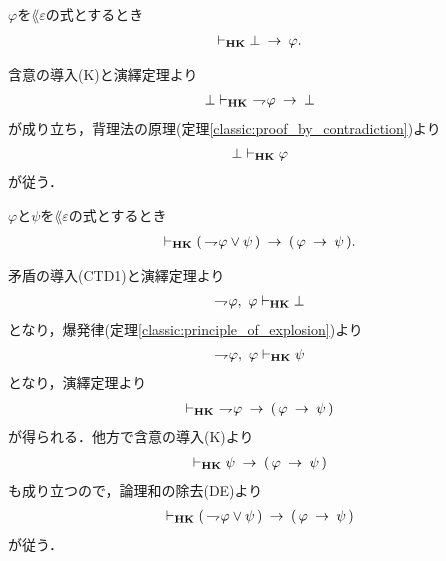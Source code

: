 	\begin{screen}
		\begin{thm}[爆発律]
		\label{classic:principle_of_explosion}
			$\varphi$を$\lang{\varepsilon}$の式とするとき
			\begin{align}
				\vdash_{{\scriptsize \mbox{{\bf HK}}}} \bot \hspace{0.25em}\rightarrow\hspace{0.25em} \varphi.
			\end{align}
		\end{thm}
	\end{screen}
	
	\begin{sketch}
		含意の導入(K)と演繹定理より
		\begin{align}
			\bot \vdash_{{\scriptsize \mbox{{\bf HK}}}}\ \rightharpoondown\hspace{-0.25em} \varphi \hspace{0.25em}\rightarrow\hspace{0.25em} \bot
		\end{align}
		が成り立ち，背理法の原理(定理\ref{classic:proof_by_contradiction})より
		\begin{align}
			\bot \vdash_{{\scriptsize \mbox{{\bf HK}}}} \varphi
		\end{align}
		が従う．
		\QED
	\end{sketch}
	
	\begin{screen}
		\begin{thm}[否定の論理和は含意で表せる]
		\label{classic:disjunction_of_negation_rewritable_by_implication}
			$\varphi$と$\psi$を$\lang{\varepsilon}$の式とするとき
			\begin{align}
				\vdash_{{\scriptsize \mbox{{\bf HK}}}} (\, \rightharpoondown\hspace{-0.25em} \varphi \vee \psi\, )
				\hspace{0.25em}\rightarrow\hspace{0.25em} (\, \varphi \hspace{0.25em}\rightarrow\hspace{0.25em} \psi\, ).
			\end{align}
		\end{thm}
	\end{screen}
	
	\begin{sketch}
		矛盾の導入(CTD1)と演繹定理より
		\begin{align}
			\rightharpoondown\hspace{-0.25em} \varphi,\ \varphi \vdash_{{\scriptsize \mbox{{\bf HK}}}} \bot 
		\end{align}
		となり，爆発律(定理\ref{classic:principle_of_explosion})より
		\begin{align}
			\rightharpoondown\hspace{-0.25em} \varphi,\ \varphi \vdash_{{\scriptsize \mbox{{\bf HK}}}} \psi
		\end{align}
		となり，演繹定理より
		\begin{align}
			\vdash_{{\scriptsize \mbox{{\bf HK}}}}\ \rightharpoondown\hspace{-0.25em} \varphi \hspace{0.25em}\rightarrow\hspace{0.25em} 
			(\, \varphi \hspace{0.25em}\rightarrow\hspace{0.25em} \psi\, )
		\end{align}
		が得られる．他方で含意の導入(K)より
		\begin{align}
			\vdash_{{\scriptsize \mbox{{\bf HK}}}} \psi \hspace{0.25em}\rightarrow\hspace{0.25em} (\, \varphi \hspace{0.25em}\rightarrow\hspace{0.25em} \psi\, )
		\end{align}
		も成り立つので，論理和の除去(DE)より
		\begin{align}
			\vdash_{{\scriptsize \mbox{{\bf HK}}}} (\, \rightharpoondown\hspace{-0.25em} \varphi \vee \psi\, ) 
			\hspace{0.25em}\rightarrow\hspace{0.25em} (\, \varphi \hspace{0.25em}\rightarrow\hspace{0.25em} \psi\, )
		\end{align}
		が従う．
		\QED
	\end{sketch}
	
